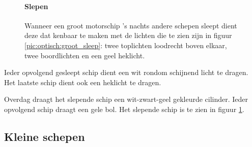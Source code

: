 \begin{figure}[H]
	\centering
	\begin{minipage}[t]{0.50\textwidth}
		\paragraph{Slepen}
		Wanneer een groot motorschip 's nachts andere schepen sleept dient deze dat kenbaar te maken met de lichten die te zien zijn in figuur \ref{pic:optisch:groot_sleep}: twee toplichten loodrecht boven elkaar, twee boordlichten en een geel heklicht.
	\end{minipage}
	\hfill
	\begin{minipage}[t]{0.22\textwidth}
		\RemoveLine
		\caption{}
		\label{pic:optisch:groot_sleep}
	\end{minipage}
	\hfill
	\begin{minipage}[t]{0.22\textwidth}
		\RemoveLine
		\caption{}
		\label{pic:optisch:groot_sleep2}
	\end{minipage}
\end{figure}
\vspace{-0.6cm}
Ieder opvolgend gesleept schip dient een wit rondom schijnend licht te dragen. Het laatste schip dient ook een heklicht te dragen.

Overdag draagt het slepende schip een wit-zwart-geel gekleurde cilinder. Ieder opvolgend schip draagt een gele bol. Het slepende schip is te zien in figuur \ref{pic:optisch:groot_sleep2}.


\subsection{Kleine schepen}

